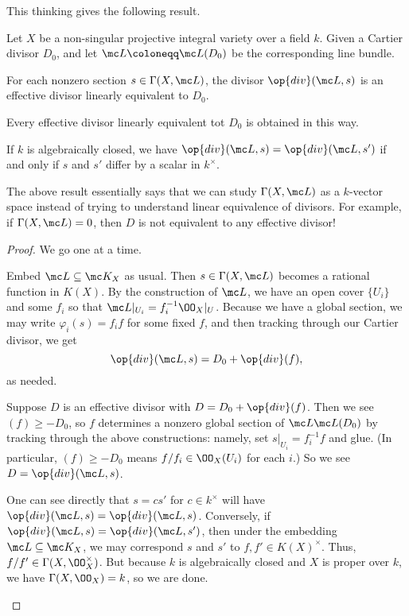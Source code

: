 \documentclass[../notes.tex]{subfiles}
\begin{document}
This thinking gives the following result.
\begin{proposition}
	Let $X$ be a non-singular projective integral variety over a field $k$. Given a Cartier divisor $D_0$, and let $\mc L\coloneqq\mc L(D_0)$ be the corresponding line bundle.
	\begin{listalph}
		\item For each nonzero section $s\in\Gamma(X,\mc L)$, the divisor $\op{div}(\mc L,s)$ is an effective divisor linearly equivalent to $D_0$.
		\item Every effective divisor linearly equivalent tot $D_0$ is obtained in this way.
		\item If $k$ is algebraically closed, we have $\op{div}(\mc L,s)=\op{div}(\mc L,s')$ if and only if $s$ and $s'$ differ by a scalar in $k^\times$.
	\end{listalph}
\end{proposition}
The above result essentially says that we can study $\Gamma(X,\mc L)$ as a $k$-vector space instead of trying to understand linear equivalence of divisors. For example, if $\Gamma(X,\mc L)=0$, then $D$ is not equivalent to any effective divisor!
\begin{proof}
	We go one at a time.
	\begin{listalph}
		\item Embed $\mc L\subseteq\mc K_X$ as usual. Then $s\in\Gamma(X,\mc L)$ becomes a rational function in $K(X)$. By the construction of $\mc L$, we have an open cover $\{U_i\}$ and some $f_i$ so that $\mc L|_{U_i}=f_i^{-1}\OO_X|_U$. Because we have a global section, we may write $\varphi_i(s)=f_if$ for some fixed $f$, and then tracking through our Cartier divisor, we get
		\[\op{div}(\mc L,s)=D_0+\op{div}(f),\]
		as needed.
		\item Suppose $D$ is an effective divisor with $D=D_0+\op{div}(f)$. Then we see $(f)\ge-D_0$, so $f$ determines a nonzero global section of $\mc L\mc L(D_0)$ by tracking through the above constructions: namely, set $s|_{U_i}=f_i^{-1}f$ and glue. (In particular, $(f)\ge-D_0$ means $f/f_i\in \OO_X(U_i)$ for each $i$.) So we see $D=\op{div}(\mc L,s)$.
		\item One can see directly that $s=cs'$ for $c\in k^\times$ will have $\op{div}(\mc L,s)=\op{div}(\mc L,s)$. Conversely, if $\op{div}(\mc L,s)=\op{div}(\mc L,s')$, then under the embedding $\mc L\subseteq\mc K_X$, we may correspond $s$ and $s'$ to $f,f'\in K(X)^\times$. Thus, $f/f'\in\Gamma(X,\OO_X^\times)$. But because $k$ is algebraically closed and $X$ is proper over $k$, we have $\Gamma(X,\OO_X)=k$, so we are done.
		\qedhere
	\end{listalph}
\end{proof}
\end{document}
